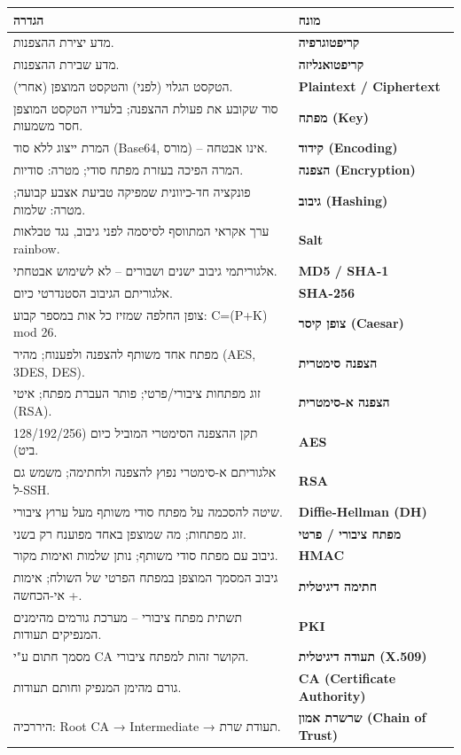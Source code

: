 \documentclass[11pt]{article}
\newcommand{\enLR}[1]{\textenglish{#1}}
\begin{document}
\begin{xltabular}{\linewidth}{|>{\setRTL\raggedleft\arraybackslash}X|>{\setRTL\raggedleft\arraybackslash}X|}
\hline
{}\textbf{הגדרה} & \textbf{מונח} \\
\hline
\endhead
מדע יצירת ההצפנות. & \textbf{קריפטוגרפיה} \\
\hline
מדע שבירת ההצפנות. & \textbf{קריפטואנליזה} \\
\hline
הטקסט הגלוי (לפני) והטקסט המוצפן (אחרי). & \textbf{\enLR{Plaintext / Ciphertext}} \\
\hline
סוד שקובע את פעולת ההצפנה; בלעדיו הטקסט המוצפן חסר משמעות. & \textbf{מפתח \enLR{(Key)}} \\
\hline
המרת ייצוג ללא סוד \enLR{(Base64}, מורס) – אינו אבטחה. & \textbf{קידוד \enLR{(Encoding)}} \\
\hline
המרה הפיכה בעזרת מפתח סודי; מטרה: סודיות. & \textbf{הצפנה \enLR{(Encryption)}} \\
\hline
פונקציה חד-כיוונית שמפיקה טביעת אצבע קבועה; מטרה: שלמות. & \textbf{גיבוב \enLR{(Hashing)}} \\
\hline
ערך אקראי המתווסף לסיסמה לפני גיבוב, נגד טבלאות \enLR{rainbow.} & \textbf{\enLR{Salt}} \\
\hline
אלגוריתמי גיבוב ישנים ושבורים – לא לשימוש אבטחתי. & \textbf{\enLR{MD5 / SHA-1}} \\
\hline
אלגוריתם הגיבוב הסטנדרטי כיום. & \textbf{\enLR{SHA-256}} \\
\hline
צופן החלפה שמזיז כל אות במספר קבוע: \enLR{C=(P+K) mod 26.} & \textbf{צופן קיסר \enLR{(Caesar)}} \\
\hline
מפתח אחד משותף להצפנה ולפענוח; מהיר \enLR{(AES, 3DES, DES).} & \textbf{הצפנה סימטרית} \\
\hline
זוג מפתחות ציבורי/פרטי; פותר העברת מפתח; איטי \enLR{(RSA).} & \textbf{הצפנה א-סימטרית} \\
\hline
תקן ההצפנה הסימטרי המוביל כיום \enLR{(128/192/256} ביט). & \textbf{\enLR{AES}} \\
\hline
אלגוריתם א-סימטרי נפוץ להצפנה ולחתימה; משמש גם ל-\enLR{SSH.} & \textbf{\enLR{RSA}} \\
\hline
שיטה להסכמה על מפתח סודי משותף מעל ערוץ ציבורי. & \textbf{\enLR{Diffie-Hellman (DH)}} \\
\hline
זוג מפתחות; מה שמוצפן באחד מפוענח רק בשני. & \textbf{מפתח ציבורי / פרטי} \\
\hline
גיבוב עם מפתח סודי משותף; נותן שלמות ואימות מקור. & \textbf{\enLR{HMAC}} \\
\hline
גיבוב המסמך המוצפן במפתח הפרטי של השולח; אימות + אי-הכחשה. & \textbf{חתימה דיגיטלית} \\
\hline
תשתית מפתח ציבורי – מערכת גורמים מהימנים המנפיקים תעודות. & \textbf{\enLR{PKI}} \\
\hline
מסמך חתום ע"י \enLR{CA} הקושר זהות למפתח ציבורי. & \textbf{תעודה דיגיטלית \enLR{(X.509)}} \\
\hline
גורם מהימן המנפיק וחותם תעודות. & \textbf{\enLR{CA (Certificate Authority)}} \\
\hline
היררכיה: \enLR{Root CA} → \enLR{Intermediate} → תעודת שרת. & \textbf{שרשרת אמון \enLR{(Chain of Trust)}} \\
\hline
\end{xltabular}
\end{document}
